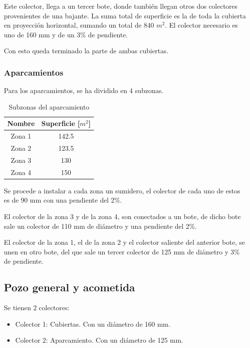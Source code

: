 \documentclass[../main.tex]{subfiles}
\begin{document}
Este colector, llega a un tercer bote, donde también llegan otros dos colectores provenientes de una bajante. La suma total de superficie es la de toda la cubierta en proyección horizontal, sumando un total de 840 $m^2$. El colector necesario es uno de 160 mm y de un 3\% de pendiente.

Con esto queda terminado la parte de ambas cubiertas.

\subsubsection{Aparcamientos}

Para los aparcamientos, se ha dividido en 4 subzonas.

\begin{table}[H]
    \centering
    \begin{tabular}{c|c}
         Nombre & Superficie [$m^2$] \\ \hline
         Zona 1 & 142.5 \\
         Zona 2 & 123.5\\
         Zona 3 & 130\\
         Zona 4 & 150\\
    \end{tabular}
    \caption{Subzonas del aparcamiento}
\end{table}

Se procede a instalar a cada zona un sumidero, el colector de cada uno de estos es de 90 mm con una pendiente del 2\%.

El colector de la zona 3 y de la zona 4, son conectados a un bote, de dicho bote sale un colector de 110 mm de diámetro y una pendiente del 2\%.

El colector de la zona 1, el de la zona 2 y el colector saliente del anterior bote, se unen en otro bote, del que sale un tercer colector de 125 mm de diámetro y 3\% de pendiente.

\subsection{Pozo general y acometida}

Se tienen 2 colectores:

\begin{itemize}
    \item Colector 1: Cubiertas. Con un diámetro de 160 mm.
    \item Colector 2: Aparcamiento. Con un diámetro de 125 mm.
\end{itemize}
\end{document}
